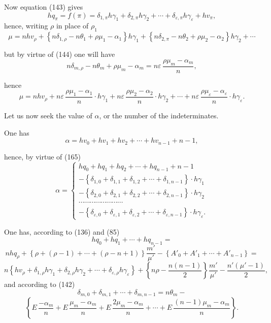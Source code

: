 \documentclass{article}
\begin{document}
Now equation (143) gives
\[ hq_\pi = f(\pi) = \delta_{1,\pi}h\gamma_1+\delta_{2,\pi}h\gamma_2+\cdots+\delta_{\varepsilon,\pi}h\gamma_\varepsilon+hv_\pi, \tag{165} \]
hence, writing $\rho$ in place of $\rho_1$
\[ \mu = nhv_\rho+\left\{n\delta_{1,\rho}-n\theta_1+\rho\mu_1-\alpha_1\right\}h\gamma_1+\left\{n\delta_{2,\pi}-n\theta_2+\rho\mu_2-\alpha_2\right\}h\gamma_2+\cdots \]

but by virtue of (144) one will have
\[ n\delta_{m,\rho} - n\theta_m + \rho\mu_m - \alpha_m = n\varepsilon\,\frac{\rho\mu_m-\alpha_m}{n}, \]

hence
\[ \mu = nhv_\rho+n\varepsilon\,\frac{\rho\mu_1-\alpha_1}{n} \cdot h\gamma_1+n\varepsilon\,\frac{\rho\mu_2-\alpha_2}{n} \cdot h\gamma_2+\cdots+n\varepsilon\,\frac{\rho\mu_\varepsilon-\alpha_\varepsilon}{n} \cdot h\gamma_\varepsilon. \tag{166} \]

Let us now seek the value of $\alpha$, or the number of the indeterminates.

One has
\[ \alpha = hv_0+hv_1+hv_2+\cdots+hv_{n-1}+n-1, \]

hence, by virtue of (165)
\[ \alpha = \begin{cases}
hq_0+hq_1+hq_2+\cdots+hq_{n-1}+n-1 \\
-\left\{\delta_{1,0}+\delta_{1,1}+\delta_{1,2}+\cdots+\delta_{1,n-1}\right\} \cdot h\gamma_1 \\
-\left\{\delta_{2,0}+\delta_{2,1}+\delta_{2,2}+\cdots+\delta_{2,n-1}\right\} \cdot h\gamma_2 \\
\cdots\cdots\cdots\cdots\cdots\cdots\cdots\cdots \\
-\left\{\delta_{\varepsilon,0}+\delta_{\varepsilon,1}+\delta_{\varepsilon,2}+\cdots+\delta_{\varepsilon,n-1}\right\} \cdot h\gamma_\varepsilon.
\end{cases} \tag{167} \]

One has, according to (136) and (85)
\[ hq_0+hq_1+\cdots+hq_{n-1} = \]
\[ nhq_\rho+\left\{\rho+(\rho-1)+\cdots+(\rho-n+1)\right\}\frac{m'}{\mu'}-\left\{A'_0+A'_1+\cdots+A'_{n-1}\right\} = \]
\[ n\left\{hv_\rho+\delta_{1,\rho}h\gamma_1+\delta_{2,\rho}h\gamma_2+\cdots+\delta_{\varepsilon,\rho}h\gamma_\varepsilon\right\} + \left\{n\rho-\frac{n(n-1)}{2}\right\}\frac{m'}{\mu'} - \frac{n'(\mu'-1)}{2}, \]
and according to (142)
\[ \delta_{m,0}+\delta_{m,1}+\cdots+\delta_{m,n-1} = n\theta_m - \]
\[ \left\{ E\,\frac{-\alpha_m}{n} + E\,\frac{\mu_m-\alpha_m}{n} + E\,\frac{2\mu_m-\alpha_m}{n} + \cdots + E\,\frac{(n-1)\mu_m-\alpha_m}{n} \right\}. \tag{169} \]
\end{document}
